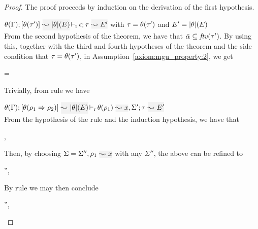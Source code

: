 \begin{proof}
The proof proceeds by induction on the derivation of the first hypothesis.
\begin{description}
\setlength{\itemsep}{1em}
\item[\fbox{\rref{M-Simp}}]\quad
$\dmres{\theta(\tenv)}{\theta(\type')}{\etrans{\theta}(E)}{\type}{E'}{\epsilon}$ \quad with $\tau = \theta(\tau')$ and $E' = {|\theta|}(E)$ \\

From the second hypothesis of the theorem, we have that $\bar\alpha\subseteq{\it ftv }(\tau')$. By
using this, together with the third and fourth hypotheses of the theorem and the side condition
that $\tau = \theta(\tau')$, in Assumption~\ref{axiom:mgu_property:2}, we get
\begin{myequation*}
  \theta = 
\end{myequation*}
Trivially, from rule  we have
\begin{myequation*}
\end{myequation*}

\item[\fbox{\rref{M-IApp}}]\quad
$\dmres{\theta(\tenv)}{\theta(\rulet_1\To\rulet_2)}{\etrans{\theta}(E)}{\type}{E'}{\ie{\theta(\rulet_1)}{x},\Sigma'}$\ \\

  From the hypothesis of the rule and the induction hypothesis, we have that
\begin{myequation*}
\forall\Sigma,\quad {}
\end{myequation*}
Then, by choosing $\Sigma = \Sigma'',\ie{\rulet_1}{x}$ with any $\Sigma''$, the above can be refined to
\begin{myequation*}
\forall \Sigma'',\quad{}
\end{myequation*}
  By rule  we may then conclude
\begin{myequation*}
\forall\Sigma'',\quad{}
\end{myequation*}


\end{description}
\end{proof}

